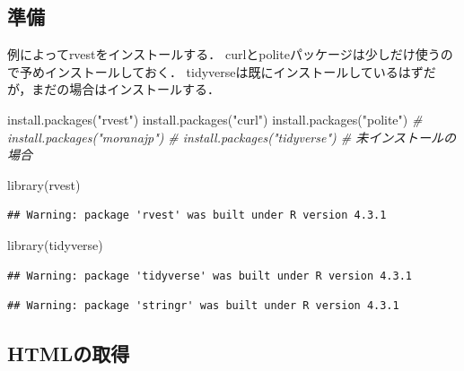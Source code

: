 \documentclass[
]{article}
\newenvironment{Shaded}{\begin{snugshade}}{\end{snugshade}}
\newcommand{\CommentTok}[1]{\textcolor[rgb]{0.56,0.35,0.01}{\textit{#1}}}
\newcommand{\FunctionTok}[1]{\textcolor[rgb]{0.00,0.00,0.00}{#1}}
\newcommand{\NormalTok}[1]{#1}
\newcommand{\StringTok}[1]{\textcolor[rgb]{0.31,0.60,0.02}{#1}}
\begin{document}
\hypertarget{ux6e96ux5099-10}{%
\subsection{準備}\label{ux6e96ux5099-10}}

例によってrvestをインストールする．
curlとpoliteパッケージは少しだけ使うので予めインストールしておく．
tidyverseは既にインストールしているはずだが，まだの場合はインストールする．

\begin{Shaded}
\begin{Highlighting}[]
\FunctionTok{install.packages}\NormalTok{(}\StringTok{"rvest"}\NormalTok{)}
\FunctionTok{install.packages}\NormalTok{(}\StringTok{"curl"}\NormalTok{)}
\FunctionTok{install.packages}\NormalTok{(}\StringTok{"polite"}\NormalTok{)}
  \CommentTok{\# install.packages("moranajp")}
  \CommentTok{\# install.packages("tidyverse") \# 未インストールの場合}
\end{Highlighting}
\end{Shaded}

\begin{Shaded}
\begin{Highlighting}[]
\FunctionTok{library}\NormalTok{(rvest)}
\end{Highlighting}
\end{Shaded}

\begin{verbatim}
## Warning: package 'rvest' was built under R version 4.3.1
\end{verbatim}

\begin{Shaded}
\begin{Highlighting}[]
\FunctionTok{library}\NormalTok{(tidyverse)}
\end{Highlighting}
\end{Shaded}

\begin{verbatim}
## Warning: package 'tidyverse' was built under R version 4.3.1
\end{verbatim}

\begin{verbatim}
## Warning: package 'stringr' was built under R version 4.3.1
\end{verbatim}

\hypertarget{htmlux306eux53d6ux5f97}{%
\subsection{HTMLの取得}\label{htmlux306eux53d6ux5f97}}
\end{document}
